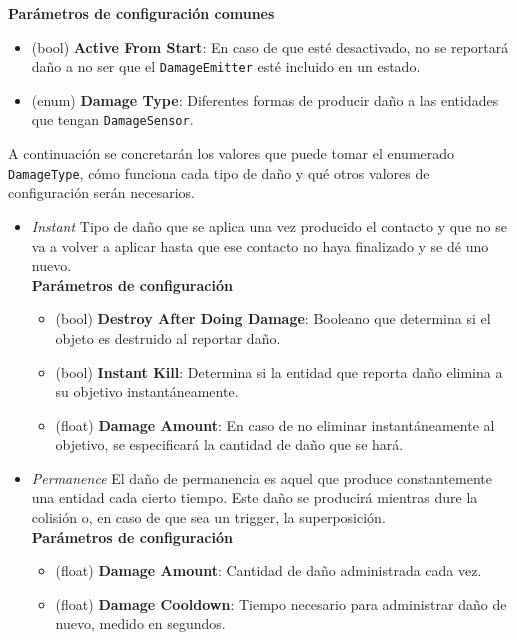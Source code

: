 \textbf{Parámetros de configuración comunes}
\begin{itemize}
	\item (bool) \textbf{Active From Start}: En caso de que esté desactivado, no se reportará daño a no ser que el \texttt{DamageEmitter} esté incluido en un estado.
	\item (enum) \textbf{Damage Type}: Diferentes formas de producir daño a las entidades que tengan \texttt{DamageSensor}.
\end{itemize}

A continuación se concretarán los valores que puede tomar el enumerado \texttt{DamageType}, cómo funciona cada tipo de daño y qué otros valores de configuración serán necesarios.\\

\begin{itemize}
	\item \textit{Instant}
Tipo de daño que se aplica una vez producido el contacto y que no se va a volver a aplicar hasta que ese contacto no haya finalizado y se dé uno nuevo.\\

\textbf{Parámetros de configuración}
	\begin{itemize}
	        \item (bool) \textbf{Destroy After Doing Damage}: Booleano que determina si el objeto es destruido al reportar daño.
	        \item (bool) \textbf{Instant Kill}: Determina si la entidad que reporta daño elimina a su objetivo instantáneamente.
	        \item (float) \textbf{Damage Amount}: En caso de no eliminar instantáneamente al objetivo, se especificará la cantidad de daño que se hará.
	 \end{itemize}
	\item \textit{Permanence}
El daño de permanencia es aquel que produce constantemente una entidad cada cierto tiempo. Este daño se producirá mientras dure la colisión o, en caso de que sea un trigger, la superposición.\\

\textbf{Parámetros de configuración}
	\begin{itemize}
	        \item (float) \textbf{Damage Amount}: Cantidad de daño administrada cada vez.
	        \item (float) \textbf{Damage Cooldown}: Tiempo necesario para administrar daño de nuevo, medido en segundos.
	\end{itemize}


\end{itemize}
